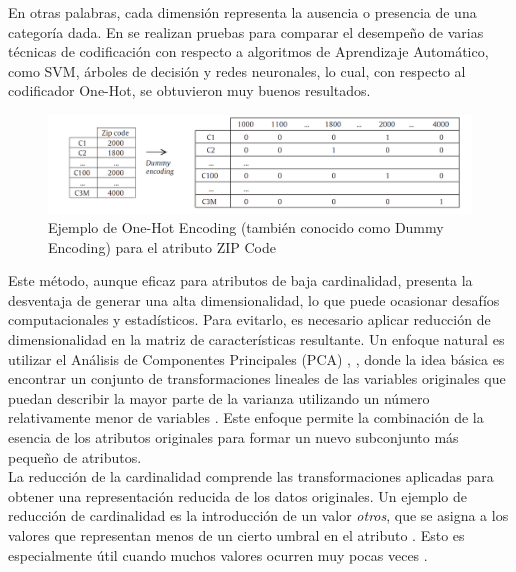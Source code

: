 En otras palabras, cada dimensión representa la ausencia o presencia de una categoría dada. En \citep{hooi2022feature} se realizan pruebas para comparar el desempeño de varias técnicas de codificación con respecto a algoritmos de Aprendizaje Automático, como SVM, árboles de decisión y redes neuronales, lo cual, con respecto al codificador One-Hot, se obtuvieron muy buenos resultados. \\
\begin{figure}[H]
	\centering
	\includegraphics[width=0.8\linewidth]{"figuras/capi 1/one-hot-ejemplo"}
	\caption{Ejemplo de One-Hot Encoding (también conocido como Dummy Encoding) para el atributo ZIP Code}
	\label{fig:one-hot-ejemplo}
\end{figure}
Este método, aunque eficaz para atributos de baja cardinalidad, presenta la desventaja de generar una alta dimensionalidad, lo que puede ocasionar desafíos computacionales y estadísticos. Para evitarlo, es necesario aplicar reducción de dimensionalidad en la matriz de características resultante. Un enfoque natural es utilizar el Análisis de Componentes Principales (PCA) \citep{mahmood2022accurate}, \citep{kasemtaweechok2021large} , donde la idea básica es encontrar un conjunto de transformaciones lineales de las variables originales que puedan describir la mayor parte de la varianza utilizando un número relativamente menor de variables \citep{garcia2015data}. Este enfoque permite la combinación de la esencia de los atributos originales para formar un nuevo subconjunto más pequeño de atributos. \\
La reducción de la cardinalidad comprende las transformaciones aplicadas para obtener una representación reducida de los datos originales. Un ejemplo de reducción de cardinalidad es la introducción de un valor \textit{otros}, que se asigna a los valores que representan menos de un cierto umbral en el atributo \citep{casas2019data}. Esto es especialmente útil cuando muchos valores ocurren muy pocas veces \citep{ventevogel2020construction}.

